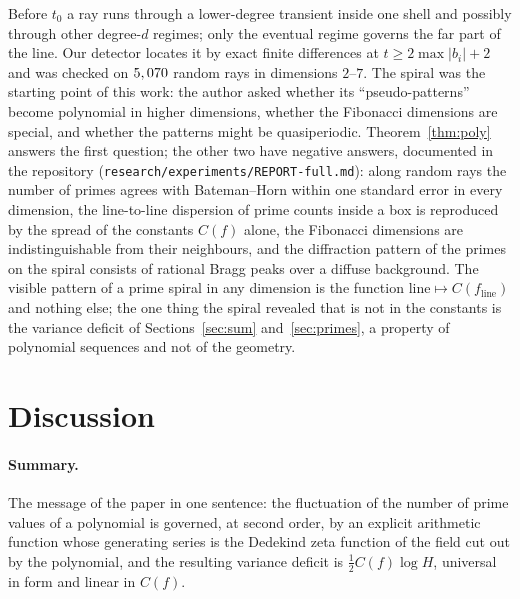 \documentclass[11pt,a4paper]{article}
\theoremstyle{remark}\newtheorem{remark}[theorem]{Remark}
\begin{document}
Before $t_0$ a ray runs through a lower-degree transient inside one shell and possibly through other
degree-$d$ regimes; only the eventual regime governs the far part of the line. Our detector locates it
by exact finite differences at $t\ge2\max|b_i|+2$ and was checked on $5,070$ random rays in
dimensions $2$--$7$. The spiral was the starting point of this work: the author asked whether its
``pseudo-patterns'' become polynomial in higher dimensions, whether the Fibonacci dimensions are special,
and whether the patterns might be quasiperiodic. Theorem~\ref{thm:poly} answers the first question; the
other two have negative answers, documented in the repository (\texttt{research/experiments/REPORT-full.md}): along
random rays the number of primes agrees with Bateman--Horn within one standard error in every dimension,
the line-to-line dispersion of prime counts inside a box is reproduced by the spread of the constants
$C(f)$ alone, the Fibonacci dimensions are indistinguishable from their neighbours, and the diffraction
pattern of the primes on the spiral consists of rational Bragg peaks over a diffuse background. The
visible pattern of a prime spiral in any dimension is the function $\text{line}\mapsto C(f_{\text{line}})$
and nothing else; the one thing the spiral revealed that is not in the constants is the variance deficit
of Sections~\ref{sec:sum} and~\ref{sec:primes}, a property of polynomial sequences and not of the geometry.

\FloatBarrier
\section{Discussion}\label{sec:disc}

\paragraph{Summary.} The message of the paper in one sentence: the fluctuation of the number of prime
values of a polynomial is governed, at second order, by an explicit arithmetic function whose generating
series is the Dedekind zeta function of the field cut out by the polynomial, and the resulting variance
deficit is $\tfrac12C(f)\log H$, universal in form and linear in $C(f)$.
\end{document}
